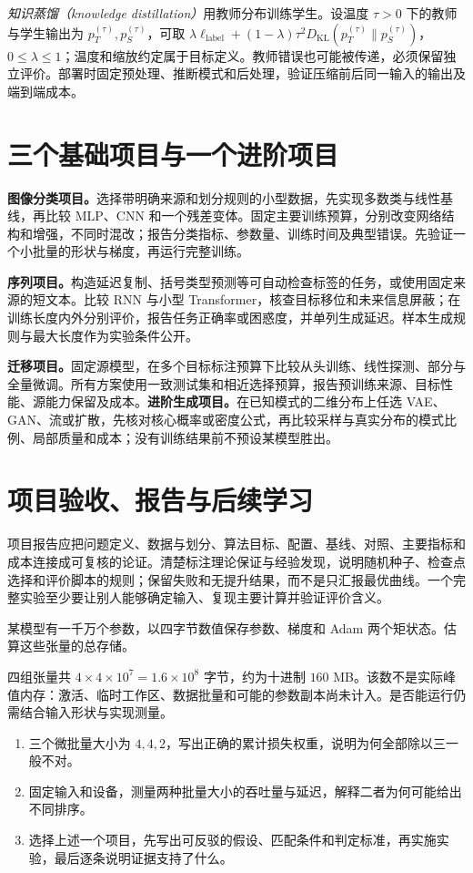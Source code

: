 \emph{知识蒸馏（knowledge distillation）}用教师分布训练学生。设温度 $\tau>0$ 下的教师与学生输出为 $p_T^{(\tau)},p_S^{(\tau)}$，可取 $\lambda\ell_{\mathrm{label}}+(1-\lambda)\tau^2D_{\mathrm{KL}}(p_T^{(\tau)}\|p_S^{(\tau)})$，$0\leq\lambda\leq1$；温度和缩放约定属于目标定义。教师错误也可能被传递，必须保留独立评价。部署时固定预处理、推断模式和后处理，验证压缩前后同一输入的输出及端到端成本。

\section{三个基础项目与一个进阶项目}
\textbf{图像分类项目。}选择带明确来源和划分规则的小型数据，先实现多数类与线性基线，再比较 MLP、CNN 和一个残差变体。固定主要训练预算，分别改变网络结构和增强，不同时混改；报告分类指标、参数量、训练时间及典型错误。先验证一个小批量的形状与梯度，再运行完整训练。

\textbf{序列项目。}构造延迟复制、括号类型预测等可自动检查标签的任务，或使用固定来源的短文本。比较 RNN 与小型 Transformer，核查目标移位和未来信息屏蔽；在训练长度内外分别评价，报告任务正确率或困惑度，并单列生成延迟。样本生成规则与最大长度作为实验条件公开。

\textbf{迁移项目。}固定源模型，在多个目标标注预算下比较从头训练、线性探测、部分与全量微调。所有方案使用一致测试集和相近选择预算，报告预训练来源、目标性能、源能力保留及成本。\textbf{进阶生成项目。}在已知模式的二维分布上任选 VAE、GAN、流或扩散，先核对核心概率或密度公式，再比较采样与真实分布的模式比例、局部质量和成本；没有训练结果前不预设某模型胜出。

\section{项目验收、报告与后续学习}
项目报告应把问题定义、数据与划分、算法目标、配置、基线、对照、主要指标和成本连接成可复核的论证。清楚标注理论保证与经验发现，说明随机种子、检查点选择和评价脚本的规则；保留失败和无提升结果，而不是只汇报最优曲线。一个完整实验至少要让别人能够确定输入、复现主要计算并验证评价含义。

\begin{example}[训练状态的存储估计]
某模型有一千万个参数，以四字节数值保存参数、梯度和 Adam 两个矩状态。估算这些张量的总存储。
\end{example}
\begin{solve}
四组张量共 $4\times4\times10^7=1.6\times10^8$ 字节，约为十进制 $160$ MB。该数不是实际峰值内存：激活、临时工作区、数据批量和可能的参数副本尚未计入。是否能运行仍需结合输入形状与实现测量。
\end{solve}
\begin{enumerate}
\item 三个微批量大小为 $4,4,2$，写出正确的累计损失权重，说明为何全部除以三一般不对。
\item 固定输入和设备，测量两种批量大小的吞吐量与延迟，解释二者为何可能给出不同排序。
\item 选择上述一个项目，先写出可反驳的假设、匹配条件和判定标准，再实施实验，最后逐条说明证据支持了什么。
\end{enumerate}

